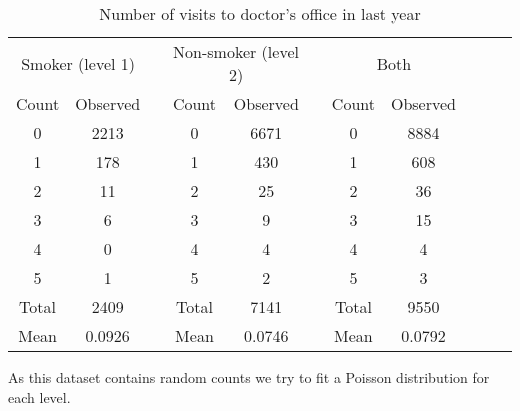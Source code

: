 \documentclass[12pt]{article}
\begin{document}
\begin{table}[htp]
\caption{Number of visits to doctor's office in last year}
\begin{center}
%
%



\begin{tabular}{ccccccccccc}
\hline\hline
 \multicolumn{2}{c}{Smoker (level 1)} & & \multicolumn{2}{c}{Non-smoker (level 2)} & & \multicolumn{2}{c}{Both}\\
  \cline{1-2}  \cline{4-5}\cline{7-8}
  Count & Observed & & Count & Observed  &  & Count & Observed \\
    \cline{1-2}  \cline{4-5} \cline{7-8} 
0 & 2213 &  & 0 & 6671 &  & 0 & 8884 \\
1 & 178 &  & 1 & 430 &  & 1 & 608 \\
2 & 11 &  & 2 & 25 &  & 2 & 36 \\
3 & 6 &  & 3 & 9 &  & 3 & 15 \\
4 & 0 &  & 4 & 4 &  & 4 & 4 \\
5 & 1 &  & 5 & 2 &  & 5 & 3 \\

  \cline{1-2}  \cline{4-5}\cline{7-8}
Total & 2409 &  & Total & 7141 &  & Total & 9550 \\
Mean & 0.0926 &  & Mean & 0.0746 &  & Mean & 0.0792 \\

\hline\hline
    \end{tabular}
\end{center}
\label{tab.type}
\end{table}%
As this dataset contains random counts we try to fit a Poisson distribution for each level. \\
\end{document}
